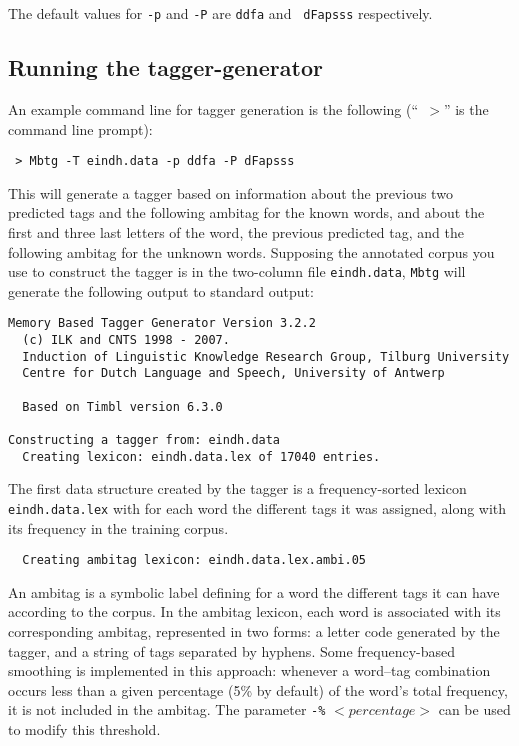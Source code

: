 \documentclass{report}
\begin{document}
The default values for {\tt -p} and {\tt -P} are {\tt ddfa} and {\tt
  dFapsss} respectively. 

\subsection{Running the tagger-generator}

An example command line for tagger generation is the following (``{\tt
$>$}'' is the command line prompt):

{\small
\begin{verbatim}
 > Mbtg -T eindh.data -p ddfa -P dFapsss
\end{verbatim}
}

This will generate a tagger based on information about the previous
two predicted tags and the following ambitag for the known words, and
about the first and three last letters of the word, the previous predicted
tag, and the following ambitag for the unknown words. Supposing the
annotated corpus you use to construct the tagger is in the two-column
file {\tt eindh.data}, {\tt Mbtg} will generate the following output
to standard output:

{\small
\begin{verbatim}
Memory Based Tagger Generator Version 3.2.2
  (c) ILK and CNTS 1998 - 2007.
  Induction of Linguistic Knowledge Research Group, Tilburg University
  Centre for Dutch Language and Speech, University of Antwerp

  Based on Timbl version 6.3.0

Constructing a tagger from: eindh.data
  Creating lexicon: eindh.data.lex of 17040 entries.
\end{verbatim}
}

The first data structure created by the tagger is a frequency-sorted
lexicon {\tt eindh.data.lex} with for each word the different tags it
was assigned, along with its frequency in the training corpus. 

{\small
\begin{verbatim}
  Creating ambitag lexicon: eindh.data.lex.ambi.05
\end{verbatim}
}

An ambitag is a symbolic label defining for a word the different
tags it can have according to the corpus.  In the ambitag lexicon,
each word is associated with its corresponding ambitag, represented in
two forms: a letter code generated by the tagger, and a string of tags
separated by hyphens. Some frequency-based smoothing is implemented in
this approach: whenever a word--tag combination occurs less than a
given percentage (5\% by default) of the word's total frequency, it is
not included in the ambitag. The parameter {\tt -\%} $<percentage>$ can be
used to modify this threshold. 
\end{document}
